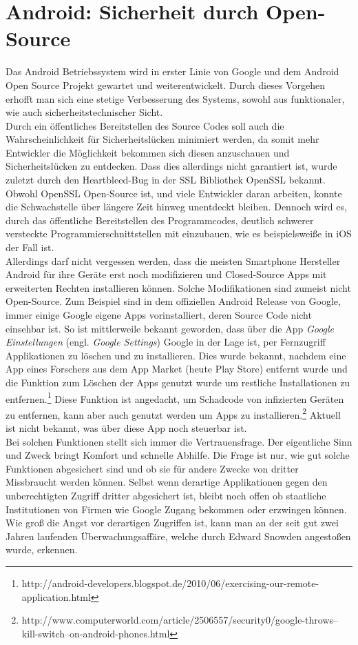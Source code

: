 \section{Android: Sicherheit durch Open-Source}
Das Android Betriebssystem wird in erster Linie von Google und dem Android Open Source Projekt gewartet und weiterentwickelt. Durch dieses Vorgehen erhofft man sich eine stetige Verbesserung des Systems, sowohl aus funktionaler, wie auch sicherheitstechnischer Sicht. \\
Durch ein öffentliches Bereitstellen des Source Codes soll auch die Wahrscheinlichkeit für Sicherheitslücken minimiert werden, da somit mehr Entwickler die Möglichkeit bekommen sich diesen anzuschauen und Sicherheitslücken zu entdecken. Dass dies allerdings nicht garantiert ist, wurde zuletzt durch den Heartbleed-Bug in der SSL Bibliothek OpenSSL bekannt. Obwohl OpenSSL Open-Source ist, und viele Entwickler daran arbeiten, konnte die Schwachstelle über längere Zeit hinweg unentdeckt bleiben. Dennoch wird es, durch das öffentliche Bereitstellen des Programmcodes, deutlich schwerer versteckte Programmierschnittstellen mit einzubauen, wie es beispielsweiße in iOS der Fall ist.\\
Allerdings darf nicht vergessen werden, dass die meisten Smartphone Hersteller Android für ihre Geräte erst noch modifizieren und Closed-Source Apps mit erweiterten Rechten installieren können. Solche Modifikationen sind zumeist nicht Open-Source. Zum Beispiel sind in dem offiziellen Android Release von Google, immer einige Google eigene Apps vorinstalliert, deren Source Code nicht einsehbar ist. So ist mittlerweile bekannt geworden, dass über die App \textit{Google Einstellungen} (engl. \textit{Google Settings}) Google in der Lage ist, per Fernzugriff Applikationen zu löschen und zu installieren. Dies wurde bekannt, nachdem eine App eines Forschers aus dem App Market (heute Play Store) entfernt wurde und die Funktion zum Löschen der Apps genutzt wurde um restliche Installationen zu entfernen.\footnote{http://android-developers.blogspot.de/2010/06/exercising-our-remote-application.html} 
Diese Funktion ist angedacht, um Schadcode von infizierten Geräten zu entfernen, kann aber auch genutzt werden um Apps zu installieren.\footnote{http://www.computerworld.com/article/2506557/security0/google-throws--kill-switch--on-android-phones.html} Aktuell ist nicht bekannt, was über diese App noch steuerbar ist.\\
Bei solchen Funktionen stellt sich immer die Vertrauensfrage. Der eigentliche Sinn und Zweck bringt Komfort und schnelle Abhilfe. Die Frage ist nur, wie gut solche Funktionen abgesichert sind und ob sie für andere Zwecke von dritter Missbraucht werden können. Selbst wenn derartige Applikationen gegen den unberechtigten Zugriff dritter abgesichert ist, bleibt noch offen ob staatliche Institutionen von Firmen wie Google Zugang bekommen oder erzwingen können. Wie groß die Angst vor derartigen Zugriffen ist, kann man an der seit gut zwei Jahren laufenden Überwachungsaffäre, welche durch Edward Snowden angestoßen wurde, erkennen.